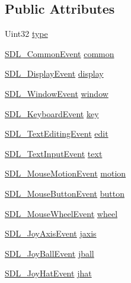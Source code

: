\subsection*{Public Attributes}
\begin{DoxyCompactItemize}
\item 
Uint32 \hyperlink{unionSDL__Event_a237648bec242d2d5835f1a4250ddfa46}{type}
\item 
\hyperlink{structSDL__CommonEvent}{S\+D\+L\+\_\+\+Common\+Event} \hyperlink{unionSDL__Event_abe5cb8767f93de55163c8ddd4562a7f2}{common}
\item 
\hyperlink{structSDL__DisplayEvent}{S\+D\+L\+\_\+\+Display\+Event} \hyperlink{unionSDL__Event_afe513d46e191a9791988b9adab705ef6}{display}
\item 
\hyperlink{structSDL__WindowEvent}{S\+D\+L\+\_\+\+Window\+Event} \hyperlink{unionSDL__Event_a826936b3275406d857bc6654669fae71}{window}
\item 
\hyperlink{structSDL__KeyboardEvent}{S\+D\+L\+\_\+\+Keyboard\+Event} \hyperlink{unionSDL__Event_ab99927835cc77a9b6bb50b419b4a27df}{key}
\item 
\hyperlink{structSDL__TextEditingEvent}{S\+D\+L\+\_\+\+Text\+Editing\+Event} \hyperlink{unionSDL__Event_a9a7e3b67b2654d4c5fc509676c6a7183}{edit}
\item 
\hyperlink{structSDL__TextInputEvent}{S\+D\+L\+\_\+\+Text\+Input\+Event} \hyperlink{unionSDL__Event_aa4fc65c559d69f33c057c0c23d8414b8}{text}
\item 
\hyperlink{structSDL__MouseMotionEvent}{S\+D\+L\+\_\+\+Mouse\+Motion\+Event} \hyperlink{unionSDL__Event_ac3c89e190faacbe84280cd539453bab6}{motion}
\item 
\hyperlink{structSDL__MouseButtonEvent}{S\+D\+L\+\_\+\+Mouse\+Button\+Event} \hyperlink{unionSDL__Event_ab6da2fa2687e5f849f270adecc64785f}{button}
\item 
\hyperlink{structSDL__MouseWheelEvent}{S\+D\+L\+\_\+\+Mouse\+Wheel\+Event} \hyperlink{unionSDL__Event_a267d3f550715519ec90a81ccd0e6cbda}{wheel}
\item 
\hyperlink{structSDL__JoyAxisEvent}{S\+D\+L\+\_\+\+Joy\+Axis\+Event} \hyperlink{unionSDL__Event_ac4611acd0e9c675e67dc20919f0accb4}{jaxis}
\item 
\hyperlink{structSDL__JoyBallEvent}{S\+D\+L\+\_\+\+Joy\+Ball\+Event} \hyperlink{unionSDL__Event_ae433f511e3383d17f8fe02df745ee8f8}{jball}
\item 
\hyperlink{structSDL__JoyHatEvent}{S\+D\+L\+\_\+\+Joy\+Hat\+Event} \hyperlink{unionSDL__Event_a421b40e0f8e01f181c8d5548cff1dd1d}{jhat}

\end{DoxyCompactItemize}
